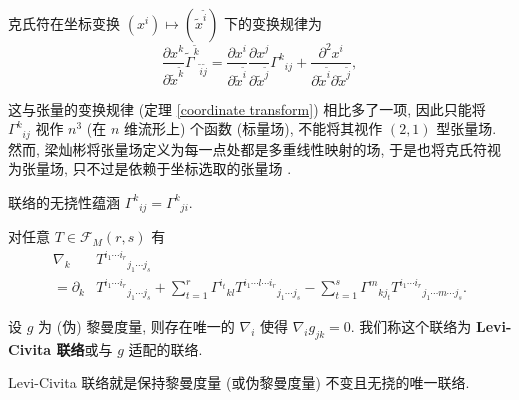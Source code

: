 \begin{theorem}
	克氏符在坐标变换 $(x^i)\mapsto(\tilde{x}^{\tilde{i}})$ 下的变换规律为
	\[ \frac{\partial x^k}{\partial \tilde{x}^{\tilde{k}}}\tilde{\Gamma}^{\tilde{k}}{}_{\tilde{i}\tilde{j}}=\frac{\partial x^{i}}{\partial \tilde{x}^{\tilde{i}}}\frac{\partial x^{j}}{\partial \tilde{x}^{\tilde{j}}} \Gamma^{k}{}_{ij}+\frac{\partial^2 x^{i}}{\partial \tilde{x}^{\tilde{i}}\partial \tilde{x}^{\tilde{j}}}, \]
\end{theorem}
\begin{remark}
	这与张量的变换规律 (定理 \ref{coordinate transform}) 相比多了一项, 因此只能将 $\Gamma^{k}{}_{ij}$ 视作 $n^3$ (在 $n$ 维流形上) 个函数 (标量场), 不能将其视作 $(2,1)$ 型张量场. 然而, 梁灿彬将张量场定义为每一点处都是多重线性映射的场, 于是也将克氏符视为张量场, 只不过是依赖于坐标选取的张量场 \cite[59 页, 注 3]{梁灿彬2000微分几何入门与广义相对论}.
\end{remark}



\begin{theorem}
	联络的无挠性蕴涵 $\Gamma^{k}{}_{ij}=\Gamma^{k}{}_{ji}$.
\end{theorem}

\begin{theorem}
	对任意 $T\in\mathcal{F}_M(r,s)$ 有
	\begin{align*}
		\nabla_k &T^{i_1\cdots i_r}{}_{j_1\cdots j_s}\\
		=\partial_k &T^{i_1\cdots i_r}{}_{j_1\cdots j_s}+\sum_{t=1}^{r}\Gamma^{i_t}{}_{kl}T^{i_1\cdots l\cdots i_r}{}_{j_1\cdots j_s}-\sum_{t=1}^{s}\Gamma^m{}_{kj_t}T^{i_1\cdots i_r}{}_{j_1\cdots m\cdots j_s}.
	\end{align*}
\end{theorem}

\begin{theorem}
	设 $g$ 为 (伪) 黎曼度量, 则存在唯一的 $\nabla_i$ 使得 $\nabla_i g_{jk}=0$. 我们称这个联络为 {\bf Levi-Civita 联络}或与 $g$ 适配的联络.
\end{theorem}
\begin{remark}
	Levi-Civita 联络就是保持黎曼度量 (或伪黎曼度量) 不变且无挠的唯一联络.
\end{remark}

